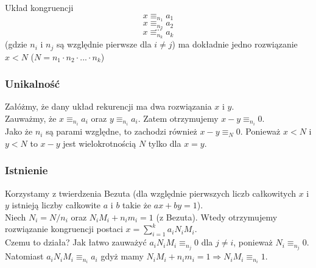 Układ kongruencji
$$x \equiv_{n_1} a_1$$
$$x \equiv_{n_2} a_2$$
$$...$$
$$x \equiv_{n_k} a_k$$
(gdzie $n_i$ i $n_j$ są względnie pierwsze dla $i\neq j$) ma dokładnie jedno rozwiązanie $x<N$ ($N=n_1\cdot n_2 \cdot ... \cdot n_k$)

\subsubsection{Unikalność}
Załóżmy, że dany układ rekurencji ma dwa rozwiązania $x$ i $y$.\\
Zauważmy, że $x\equiv_{n_i} a_i$ oraz $y\equiv_{n_i} a_i$. Zatem otrzymujemy $x-y \equiv_{n_i} 0$.\\
Jako że $n_i$ są parami względne, to zachodzi również $x-y\equiv_N 0$. Ponieważ $x<N$ i $y<N$ to $x-y$ jest wielokrotnością $N$ tylko dla $x=y$.

\subsubsection{Istnienie}
Korzystamy z twierdzenia Bezuta (dla względnie pierwszych liczb całkowitych $x$ i $y$ istnieją liczby całkowite $a$ i $b$ takie że $ax+by=1$).\\
Niech $N_i=N/n_i$ oraz $N_iM_i+n_im_i=1$ (z Bezuta). Wtedy otrzymujemy rozwiązanie kongruencji postaci $x= \sum_{i=1}^{k} a_iN_iM_i$.\\
Czemu to działa? Jak łatwo zauważyć $a_iN_iM_i\equiv_{n_j}0$ dla $j\neq i$, ponieważ $N_i \equiv_{n_j} 0$. Natomiast $a_iN_iM_i\equiv_{n_i} a_i$ gdyż mamy $N_iM_i+n_im_i=1 \Longrightarrow N_iM_i\equiv_{n_i} 1$.